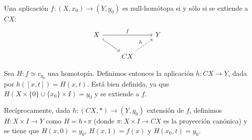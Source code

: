 \begin{teor}
Una aplicación $f : (X, x_0) \longrightarrow (Y, y_0)$ es null-homótopa si y sólo si se extiende a $CX$: 
$$
\begin{tikzcd}
	X \arrow{rr}{f} \drar[hook] & & Y \\
	& CX \urar[dashed]{h} & 
\end{tikzcd}
$$
\end{teor}
\begin{demo}
Sea $H : f \simeq c_{y_0}$ una homotopía. Definimos entonces la aplicación $h : CX \longrightarrow Y$, dada por $h([x, t]) = H(x, t)$. Está bien definida, ya que $H(X \times \{ 0 \} \cup \{ x_0 \} \times I) = y_0$ y se extiende a $f$.\par 
Recíprocamente, dada $h : (CX, \ast) \longrightarrow (Y, y_0)$ extensión de $f$, definimos $H: X \times I \longrightarrow Y$ como $H = h \circ \pi$ (donde $\pi: X \times I \longrightarrow CX$ es la proyección canónica) y se tiene que 
$H(x, 0) = y_0$, $H(x, 1) = f(x)$ y $H(x_0, t) = y_0$.
\end{demo}

